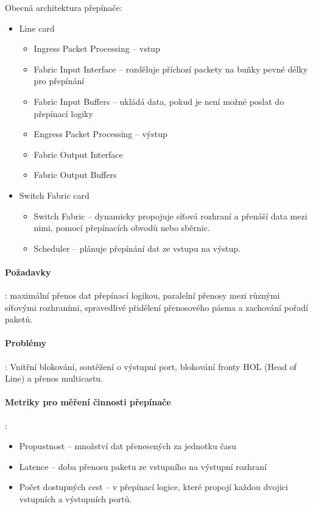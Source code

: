 \documentclass[a4paper, 11pt]{report}
\begin{document}
Obecná architektura přepínače:
\begin{itemize}
	\item Line card
	\begin{itemize}
		\item Ingress Packet Processing -- vstup
		\item Fabric Input Interface -- rozděluje příchozí packety na buňky pevné délky pro přepínání
		\item Fabric Input Buffers -- ukládá data, pokud je není možné poslat do přepínací logiky
		\item Engress Packet Processing -- výstup
		\item Fabric Output Interface
		\item Fabric Output Buffers
	\end{itemize}
	\item Switch Fabric card
	\begin{itemize}
		\item Switch Fabric -- dynamicky propojuje síťová rozhraní a přenáší data mezi nimi, pomocí přepínacích obvodů nebo sběrnic.
		\item Scheduler -- plánuje přepínání dat ze vstupu na výstup.
	\end{itemize}
\end{itemize}

\paragraph{Požadavky}: maximální přenos dat přepínací logikou, paralelní přenosy mezi různými síťovými rozhraními, spravedlivé přidělení přenosového pásma a zachování pořadí paketů.

\paragraph{Problémy}: Vnitřní blokování, soutěžení o výstupní port, blokování fronty HOL (Head of Line) a přenos multicastu.

\paragraph{Metriky pro měření činnosti přepínače}:
\begin{itemize}
	\item Propustnost -- množství dat přenesených za jednotku času
	\item Latence -- doba přenosu paketu ze vstupního na výstupní rozhraní
	\item Počet dostupných cest -- v přepínací logice, které propojí každou dvojici vstupních a výstupních portů.
\end{itemize}
\end{document}
